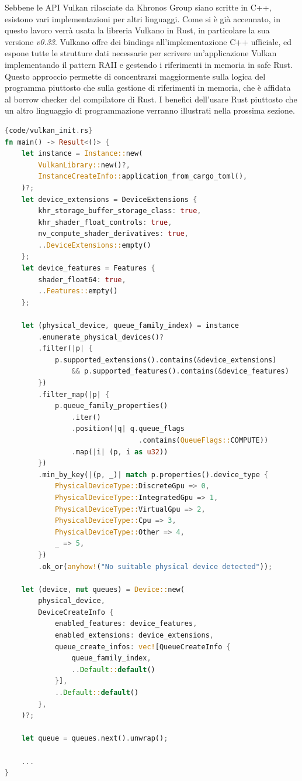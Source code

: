 Sebbene le \gls{API} Vulkan rilasciate da Khronos Group siano scritte in C++, esistono vari implementazioni per altri linguaggi. Come si è già accennato, in questo lavoro verrà usata la libreria Vulkano in Rust, in particolare la sua versione \textit{v0.33}. Vulkano offre dei bindings all'implementazione C++ ufficiale, ed  espone tutte le strutture dati necessarie per scrivere un'applicazione Vulkan implementando il pattern \gls{RAII} \cite[]{RAII:link} e gestendo i riferimenti in memoria in safe Rust. Questo approccio permette di concentrarsi maggiormente sulla logica del programma piuttosto che sulla gestione di riferimenti in memoria, che è affidata al borrow checker \cite[]{Rust:borrow_checker} del compilatore di Rust. I benefici dell'usare Rust piuttosto che un altro linguaggio di programmazione verranno illustrati nella prossima sezione.

\vspace{5mm}
\begin{lstlisting}[language=Rust, caption=Inizializzazione di Vulkan in Rust, label=lis:vulkan_init]{code/vulkan_init.rs}
fn main() -> Result<()> {
    let instance = Instance::new(
        VulkanLibrary::new()?,
        InstanceCreateInfo::application_from_cargo_toml(),
    )?;
    let device_extensions = DeviceExtensions {
        khr_storage_buffer_storage_class: true,
        khr_shader_float_controls: true,
        nv_compute_shader_derivatives: true,
        ..DeviceExtensions::empty()
    };
    let device_features = Features {
        shader_float64: true,
        ..Features::empty()
    };

    let (physical_device, queue_family_index) = instance
        .enumerate_physical_devices()?
        .filter(|p| {
            p.supported_extensions().contains(&device_extensions)
                && p.supported_features().contains(&device_features)
        })
        .filter_map(|p| {
            p.queue_family_properties()
                .iter()
                .position(|q| q.queue_flags
                                .contains(QueueFlags::COMPUTE))
                .map(|i| (p, i as u32))
        })
        .min_by_key(|(p, _)| match p.properties().device_type {
            PhysicalDeviceType::DiscreteGpu => 0,
            PhysicalDeviceType::IntegratedGpu => 1,
            PhysicalDeviceType::VirtualGpu => 2,
            PhysicalDeviceType::Cpu => 3,
            PhysicalDeviceType::Other => 4,
            _ => 5,
        })
        .ok_or(anyhow!("No suitable physical device detected"));

    let (device, mut queues) = Device::new(
        physical_device,
        DeviceCreateInfo {
            enabled_features: device_features,
            enabled_extensions: device_extensions,
            queue_create_infos: vec![QueueCreateInfo {
                queue_family_index,
                ..Default::default()
            }],
            ..Default::default()
        },
    )?;

    let queue = queues.next().unwrap();

    ...
}
\end{lstlisting}
\vspace{5mm}

